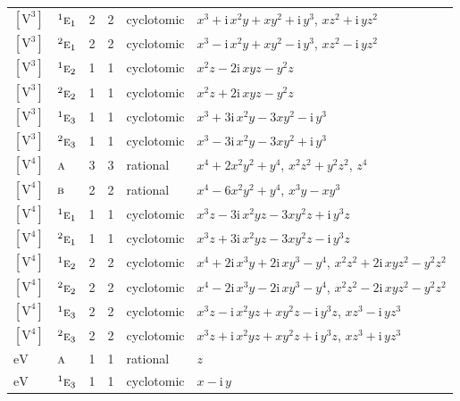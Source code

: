 \documentclass[10pt,a4paper]{article}
\numberwithin{equation}{section}
\newcommand{\irr}[1]{\text{\normalfont\scshape #1}}
\newcommand{\conjpair}[1]{{}^{#1}}
\newcommand{\iunit}{\mathrm{i}}
\newcommand{\jahn}[1]{\mathrm{#1}}
\newlength{\fillwidth}\newlength{\cellwidth}\newlength{\colwidth}
\begin{document}
{\begin{longtable}{@{}llrrl>{\RaggedRight\arraybackslash}p{\fillwidth}@{}}
$\jahn{[V^{3}]}$ & $\conjpair{1}\irr{e}_{1}$ & 2 & 2 & cyclotomic & $x^{3} + \iunit{}\,x^{2}y + xy^{2} + \iunit{}\,y^{3}$, $xz^{2} + \iunit{}\,yz^{2}$\\
$\jahn{[V^{3}]}$ & $\conjpair{2}\irr{e}_{1}$ & 2 & 2 & cyclotomic & $x^{3} - \iunit{}\,x^{2}y + xy^{2} - \iunit{}\,y^{3}$, $xz^{2} - \iunit{}\,yz^{2}$\\
$\jahn{[V^{3}]}$ & $\conjpair{1}\irr{e}_{2}$ & 1 & 1 & cyclotomic & $x^{2}z - 2\iunit{}\,xyz - y^{2}z$\\
$\jahn{[V^{3}]}$ & $\conjpair{2}\irr{e}_{2}$ & 1 & 1 & cyclotomic & $x^{2}z + 2\iunit{}\,xyz - y^{2}z$\\
$\jahn{[V^{3}]}$ & $\conjpair{1}\irr{e}_{3}$ & 1 & 1 & cyclotomic & $x^{3} + 3\iunit{}\,x^{2}y - 3xy^{2} - \iunit{}\,y^{3}$\\
$\jahn{[V^{3}]}$ & $\conjpair{2}\irr{e}_{3}$ & 1 & 1 & cyclotomic & $x^{3} - 3\iunit{}\,x^{2}y - 3xy^{2} + \iunit{}\,y^{3}$\\
$\jahn{[V^{4}]}$ & $\irr{a}$ & 3 & 3 & rational & $x^{4} + 2x^{2}y^{2} + y^{4}$, $x^{2}z^{2} + y^{2}z^{2}$, $z^{4}$\\
$\jahn{[V^{4}]}$ & $\irr{b}$ & 2 & 2 & rational & $x^{4} - 6x^{2}y^{2} + y^{4}$, $x^{3}y - xy^{3}$\\
$\jahn{[V^{4}]}$ & $\conjpair{1}\irr{e}_{1}$ & 1 & 1 & cyclotomic & $x^{3}z - 3\iunit{}\,x^{2}yz - 3xy^{2}z + \iunit{}\,y^{3}z$\\
$\jahn{[V^{4}]}$ & $\conjpair{2}\irr{e}_{1}$ & 1 & 1 & cyclotomic & $x^{3}z + 3\iunit{}\,x^{2}yz - 3xy^{2}z - \iunit{}\,y^{3}z$\\
$\jahn{[V^{4}]}$ & $\conjpair{1}\irr{e}_{2}$ & 2 & 2 & cyclotomic & $x^{4} + 2\iunit{}\,x^{3}y + 2\iunit{}\,xy^{3} - y^{4}$, $x^{2}z^{2} + 2\iunit{}\,xyz^{2} - y^{2}z^{2}$\\
$\jahn{[V^{4}]}$ & $\conjpair{2}\irr{e}_{2}$ & 2 & 2 & cyclotomic & $x^{4} - 2\iunit{}\,x^{3}y - 2\iunit{}\,xy^{3} - y^{4}$, $x^{2}z^{2} - 2\iunit{}\,xyz^{2} - y^{2}z^{2}$\\
$\jahn{[V^{4}]}$ & $\conjpair{1}\irr{e}_{3}$ & 2 & 2 & cyclotomic & $x^{3}z - \iunit{}\,x^{2}yz + xy^{2}z - \iunit{}\,y^{3}z$, $xz^{3} - \iunit{}\,yz^{3}$\\
$\jahn{[V^{4}]}$ & $\conjpair{2}\irr{e}_{3}$ & 2 & 2 & cyclotomic & $x^{3}z + \iunit{}\,x^{2}yz + xy^{2}z + \iunit{}\,y^{3}z$, $xz^{3} + \iunit{}\,yz^{3}$\\
$\jahn{eV}$ & $\irr{a}$ & 1 & 1 & rational & $z$\\
$\jahn{eV}$ & $\conjpair{1}\irr{e}_{3}$ & 1 & 1 & cyclotomic & $x - \iunit{}\,y$\\

\end{longtable}}
\end{document}
